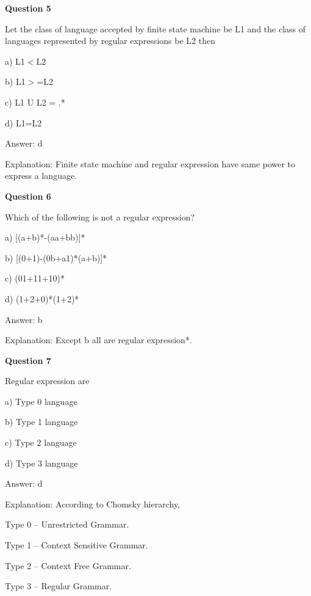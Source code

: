 \documentclass{article}
\begin{document}
\begin{mdframed}[linewidth=1pt, roundcorner=5pt, linecolor=gray!30, backgroundcolor=gray!5]
\textbf{Question 5} 

Let the class of language accepted by finite state machine be L1 and the class of languages represented by regular expressions be L2 then

a) L1$<$L2

b) L1$>$=L2

c) L1 U L2 = .*

d) L1=L2
\vspace{5pt} \par
\begin{tcolorbox}[colback=green!5, colframe=green!40!black, title=Solution]
Answer: d

Explanation: Finite state machine and regular expression have same power to express a language.
\end{tcolorbox}
\end{mdframed}

\begin{mdframed}[linewidth=1pt, roundcorner=5pt, linecolor=gray!30, backgroundcolor=gray!5]
\textbf{Question 6} 

Which of the following is not a regular expression?

a) [(a+b)*-(aa+bb)]*

b) [(0+1)-(0b+a1)*(a+b)]*

c) (01+11+10)*

d) (1+2+0)*(1+2)*
\vspace{5pt} \par
\begin{tcolorbox}[colback=green!5, colframe=green!40!black, title=Solution]
Answer: b

Explanation: Except b all are regular expression*.
\end{tcolorbox}
\end{mdframed}
\newpage

\begin{mdframed}[linewidth=1pt, roundcorner=5pt, linecolor=gray!30, backgroundcolor=gray!5]
\textbf{Question 7} 

Regular expression are

a) Type 0 language

b) Type 1 language

c) Type 2 language

d) Type 3 language
\vspace{5pt} \par
\begin{tcolorbox}[colback=green!5, colframe=green!40!black, title=Solution]
Answer: d

Explanation: According to Chomsky hierarchy,

Type 0 – Unrestricted Grammar.

Type 1 – Context Sensitive Grammar.

Type 2 – Context Free Grammar.

Type 3 – Regular Grammar.
\end{tcolorbox}
\end{mdframed}
\end{document}
